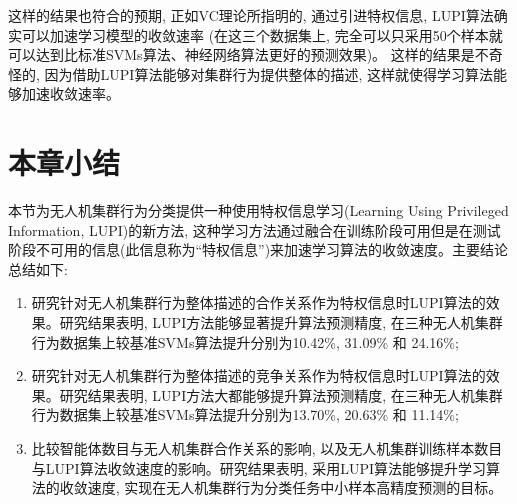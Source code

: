 这样的结果也符合的预期, 正如VC理论所指明的, 通过引进特权信息, LUPI算法确实可以加速学习模型的收敛速率 (在这三个数据集上, 完全可以只采用50个样本就可以达到比标准SVMs算法、神经网络算法更好的预测效果)。 这样的结果是不奇怪的, 因为借助LUPI算法能够对集群行为提供整体的描述, 这样就使得学习算法能够加速收敛速率。

  
\section{本章小结}
\label{sec:discuss}
本节为无人机集群行为分类提供一种使用特权信息学习(Learning Using Privileged Information, LUPI)的新方法, 这种学习方法通过融合在训练阶段可用但是在测试阶段不可用的信息(此信息称为“特权信息”)来加速学习算法的收敛速度。主要结论总结如下:
\begin{enumerate}
\item 研究针对无人机集群行为整体描述的合作关系作为特权信息时LUPI算法的效果。研究结果表明, LUPI方法能够显著提升算法预测精度, 在三种无人机集群行为数据集上较基准SVMs算法提升分别为10.42\%, 31.09\% 和 24.16\%;
\item 研究针对无人机集群行为整体描述的竞争关系作为特权信息时LUPI算法的效果。研究结果表明, LUPI方法大都能够提升算法预测精度, 在三种无人机集群行为数据集上较基准SVMs算法提升分别为13.70\%, 20.63\% 和 11.14\%;
\item 比较智能体数目与无人机集群合作关系的影响, 以及无人机集群训练样本数目与LUPI算法收敛速度的影响。研究结果表明, 采用LUPI算法能够提升学习算法的收敛速度, 实现在无人机集群行为分类任务中小样本高精度预测的目标。
\end{enumerate}
